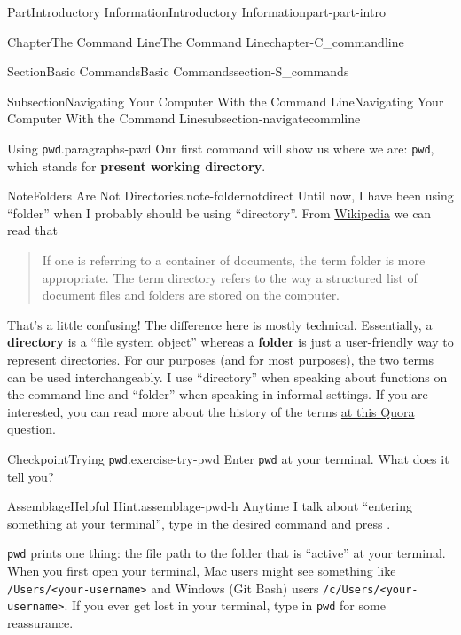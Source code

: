 \documentclass[oneside,10pt,]{book}
\newcommand{\mono}[1]{\texttt{#1}}
\newcommand{\terminology}[1]{\textbf{#1}}
\newcommand{\kbd}[1]{\keys{{#1}}}
\begin{document}
\begin{partptx}{Part}{Introductory Information}{}{Introductory Information}{}{}{part-part-intro}
\begin{chapterptx}{Chapter}{The Command Line}{}{The Command Line}{}{}{chapter-C_commandline}
\begin{sectionptx}{Section}{Basic Commands}{}{Basic Commands}{}{}{section-S_commands}
\begin{subsectionptx}{Subsection}{Navigating Your Computer With the Command Line}{}{Navigating Your Computer With the Command Line}{}{}{subsection-navigatecommline}
\begin{paragraphs}{Using \mono{pwd}.}{paragraphs-pwd}%
\index{command line!\mono{pwd}}%
%
\index{\mono{pwd}}%
Our first command will show us where we are: \mono{pwd}, which stands for \terminology{present working directory}.%
\begin{note}{Note}{Folders Are Not Directories.}{note-foldernotdirect}%
%
%
Until now, I have been using ``folder'' when I probably should be using ``directory''. From \href{https://en.wikipedia.org/wiki/Directory_\%28computing\%29\#Folder_metaphor}{Wikipedia}\footnotemark{} we can read that%
\begin{quote}%
If one is referring to a container of documents, the term folder is more appropriate. The term directory refers to the way a structured list of document files and folders are stored on the computer.%
\end{quote}
That's a little confusing! The difference here is mostly technical. Essentially, a \terminology{directory} is a ``file system object'' whereas a \terminology{folder} is just a user-friendly way to represent directories. For our purposes (and for most purposes), the two terms can be used interchangeably. I use ``directory'' when speaking about functions on the command line and ``folder'' when speaking in informal settings. If you are interested, you can read more about the history of the terms \href{https://www.quora.com/What-is-the-difference-between-a-folder-and-a-directory}{at this Quora question}\footnotemark{}.%
\end{note}
%
%
\begin{inlineexercise}{Checkpoint}{Trying \mono{pwd}.}{exercise-try-pwd}%
Enter \mono{pwd} at your terminal. What does it tell you?%
\end{inlineexercise}%
\begin{assemblage}{Assemblage}{Helpful Hint.}{assemblage-pwd-h}%
Anytime I talk about ``entering something at your terminal'', type in the desired command and press \kbd{Enter}.%
\end{assemblage}
\mono{pwd} prints one thing: the file path to the folder that is ``active'' at your terminal. When you first open your terminal, Mac users might see something like \mono{/Users/<your-username>} and Windows (Git Bash) users \mono{/c/Users/<your-username>}. If you ever get lost in your terminal, type in \mono{pwd} for some reassurance.%

\end{paragraphs}
\end{subsectionptx}
\end{sectionptx}
\end{chapterptx}
\end{partptx}
\end{document}
